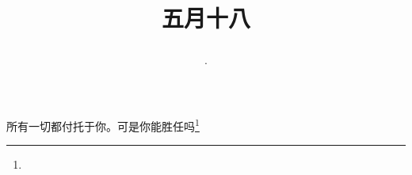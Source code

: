 \title{\date[d=23,m=6,y=2024][year:cn-y,年,month:cn,day:cn,日,·,weekday]·五月十八 }
所有一切都付托于你。可是你能胜任吗\footnote{ }


